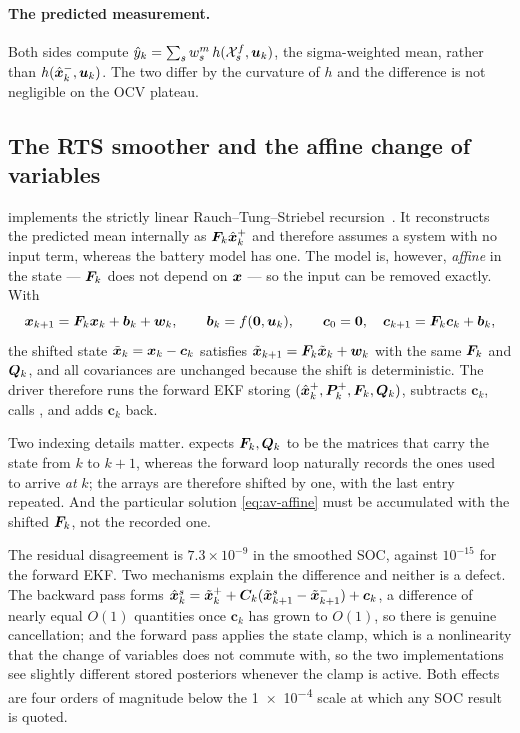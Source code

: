 \paragraph{The predicted measurement.} Both sides compute
$\hat y_k = \sum_s w^m_s\, h(\mathcal{X}^f_s,\bm{u}_k)$, the sigma-weighted mean, rather than
$h(\hat{\bm{x}}^{-}_k,\bm{u}_k)$. The two differ by the curvature of $h$ and the difference is not negligible
on the OCV plateau.

\subsection{The RTS smoother and the affine change of variables}

 implements the strictly linear
Rauch--Tung--Striebel recursion~\cite{rauch1965rts}. It reconstructs the predicted mean internally as
$\bm{F}_k\hat{\bm{x}}^{+}_k$ and therefore assumes a system with no input term, whereas the battery model has
one. The model is, however, \emph{affine} in the state --- $\bm{F}_k$ does not depend on $\bm{x}$ --- so
the input can be removed exactly. With
\begin{equation}
\bm{x}_{k+1} = \bm{F}_k\bm{x}_k + \bm{b}_k + \bm{w}_k,\qquad \bm{b}_k = f(\bm 0,\bm{u}_k),
\qquad \bm{c}_0 = \bm 0,\quad \bm{c}_{k+1} = \bm{F}_k\bm{c}_k + \bm{b}_k,
\label{eq:av-affine}
\end{equation}
the shifted state $\tilde{\bm{x}}_k = \bm{x}_k - \bm{c}_k$ satisfies $\tilde{\bm{x}}_{k+1} = \bm{F}_k\tilde{\bm{x}}_k
+ \bm{w}_k$ with the same $\bm{F}_k$ and $\bm{Q}_k$, and all covariances are unchanged because the shift is
deterministic. The driver therefore runs the forward EKF storing $(\hat{\bm{x}}^{+}_k,\bm{P}^{+}_k,\bm{F}_k,\bm{Q}_k)$,
subtracts $\bm{c}_k$, calls , and adds $\bm{c}_k$ back.

Two indexing details matter.  expects $\bm{F}_k,\bm{Q}_k$ to be the matrices that
carry the state from $k$ to $k+1$, whereas the forward loop naturally records the ones used to
arrive \emph{at} $k$; the arrays are therefore shifted by one, with the last entry repeated. And the
particular solution \eqref{eq:av-affine} must be accumulated with the shifted $\bm{F}_k$, not the
recorded one.

The residual disagreement is $7.3\times10^{-9}$ in the smoothed SOC, against $10^{-15}$ for the
forward EKF. Two mechanisms explain the difference and neither is a defect. The backward pass forms
$\hat{\bm{x}}^s_k = \tilde{\bm{x}}^+_k + \bm{C}_k(\tilde{\bm{x}}^s_{k+1} - \tilde{\bm{x}}^-_{k+1}) + \bm{c}_k$, a
difference of nearly equal $O(1)$ quantities once $\bm{c}_k$ has grown to $O(1)$, so there is genuine
cancellation; and the forward pass applies the state clamp, which is a nonlinearity that the change
of variables does not commute with, so the two implementations see slightly different stored
posteriors whenever the clamp is active. Both effects are four orders of magnitude below the
\num{1e-4} scale at which any SOC result is quoted.


